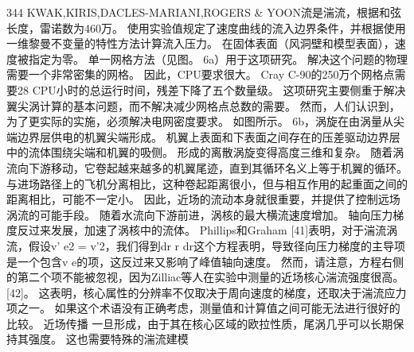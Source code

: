 \documentclass[UTF8,11pt,a4paper,openany,fontset=fandol]{ctexbook}
\begin{document}
344 KWAK,KIRIS,DACLES-MARIANI,ROGERS \& YOON流是湍流，根据和弦长度，雷诺数为460万。 使用实验值规定了速度曲线的流入边界条件，并根据使用一维黎曼不变量的特性方法计算流入压力。 在固体表面（风洞壁和模型表面），速度被指定为零。 单一网格方法（见图。 6a）用于这项研究。 解决这个问题的物理需要一个非常密集的网格。 因此，CPU要求很大。 Cray C-90的250万个网格点需要28 CPU小时的总运行时间，残差下降了五个数量级。 这项研究主要侧重于解决翼尖涡计算的基本问题，而不解决减少网格点总数的需要。 然而，人们认识到，为了更实际的实施，必须解决电网密度要求。 如图所示。 6b，涡旋在由涡量从尖端边界层供电的机翼尖端形成。 机翼上表面和下表面之间存在的压差驱动边界层中的流体围绕尖端和机翼的吸侧。 形成的离散涡旋变得高度三维和复杂。 随着涡流向下游移动，它卷起越来越多的机翼尾迹，直到其循环名义上等于机翼的循环。 与进场路径上的飞机分离相比，这种卷起距离很小，但与相互作用的起重面之间的距离相比，可能不一定小。 因此，近场的流动本身就很重要，并提供了控制远场涡流的可能手段。 随着水流向下游前进，涡核的最大横流速度增加。 轴向压力梯度反过来发展，加速了涡核中的流体。 Phillips和Graham [41]表明，对于湍流涡流，假设v' e2 = v'2，我们得到dr r dr这个方程表明，导致径向压力梯度的主导项是一个包含v e的项，这反过来又影响了峰值轴向速度。 然而，请注意，方程右侧的第二个项不能被忽视，因为Zilliac等人在实验中测量的近场核心湍流强度很高。 [42]。 这表明，核心属性的分辨率不仅取决于周向速度的梯度，还取决于湍流应力项之一。 如果这个术语没有正确考虑，测量值和计算值之间可能无法进行很好的比较。 近场传播 一旦形成，由于其在核心区域的欧拉性质，尾涡几乎可以长期保持其强度。 这也需要特殊的湍流建模
\end{document}
